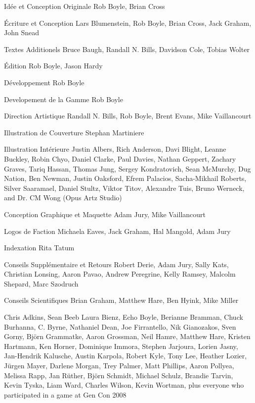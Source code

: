 \begin{description} 

\item{Idée et Conception Originale} Rob Boyle, Brian Cross 

\item{Écriture et Conception} Lars Blumenstein, Rob Boyle, Brian Cross, Jack Graham, John Snead 

\item{Textes Additionels} Bruce Baugh, Randall N. Bills, Davidson Cole, Tobias Wolter 

\item{Édition} Rob Boyle, Jason Hardy 

\item{Développement} Rob Boyle 

\item{Developement de la Gamme} Rob Boyle 

\item{Direction Artistique} Randall N. Bills, Rob Boyle, Brent Evans, Mike Vaillancourt 

\item{Illustration de Couverture} Stephan Martiniere 

\item{Illustration Intérieure} Justin Albers, Rich Anderson, Davi Blight, Leanne Buckley, Robin Chyo, Daniel Clarke, Paul Davies, Nathan Geppert, Zachary Graves, Tariq Hassan, Thomas Jung, Sergey Kondratovich, Sean McMurchy, Dug Nation, Ben Newman, Justin Oaksford, Efrem Palacios, Sacha-Mikhail Roberts, Silver Saaramael, Daniel Stultz, Viktor Titov, Alexandre Tuis, Bruno Werneck, and Dr. CM Wong (Opus Artz Studio) 

\item{Conception Graphique et Maquette} Adam Jury, Mike Vaillancourt 

\item{Logos de Faction} Michaela Eaves, Jack Graham, Hal Mangold, Adam Jury 

\item{Indexation} Rita Tatum 

\item{Conseils Supplémentaire et Retours} Robert Derie, Adam Jury, Sally Kats, Christian Lonsing, Aaron Pavao, Andrew Peregrine, Kelly Ramsey, Malcolm Shepard, Marc Szodruch 

\item{Conseils Scientifiques} Brian Graham, Matthew Hare, Ben Hyink, Mike Miller 

\item[Playtesting and Proofreading] Chris Adkins, Sean Beeb Laura Bienz, Echo Boyle, Berianne Bramman, Chuck Burhanna, C. Byrne, Nathaniel Dean, Joe Firrantello, Nik Gianozakos, Sven Gorny, Björn Grammatke, Aaron Grossman, Neil Hamre, Matthew Hare, Kristen Hartmann, Ken Horner, Dominique Immora, Stephen Jarjoura, Lorien Jasny, Jan-Hendrik Kalusche, Austin Karpola, Robert Kyle, Tony Lee, Heather Lozier, Jürgen Mayer, Darlene Morgan, Trey Palmer, Matt Phillips, Aaron Pollyea, Melissa Rapp, Jan Rüther, Björn Schmidt, Michael Schulz, Brandie Tarvin, Kevin Tyska, Liam Ward, Charles Wilson, Kevin Wortman, plus everyone who participated in a game at Gen Con 2008 


\end{description}
